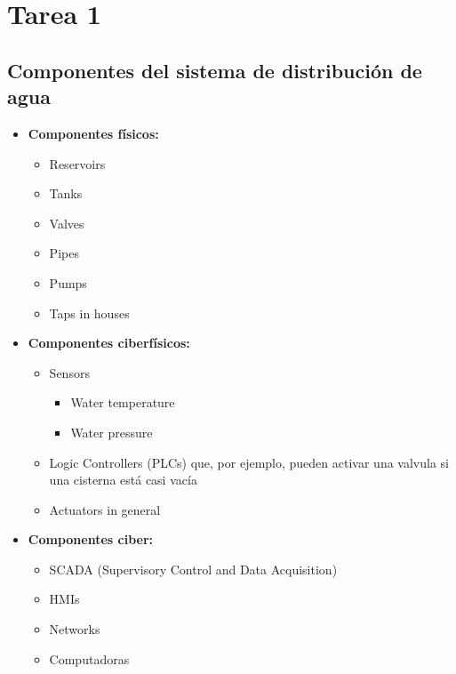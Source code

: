 \chapter{Tarea 1}








\section{Componentes del sistema de distribución de agua}

\begin{itemize}
   \item \textbf{Componentes físicos:}
   \begin{itemize}
      \item Reservoirs
      \item Tanks
      \item Valves
      \item Pipes
      \item Pumps
      \item Taps in houses
   \end{itemize}
   \item \textbf{Componentes ciberfísicos:}
   \begin{itemize}
      \item Sensors
      \begin{itemize}
         \item Water temperature
         \item Water pressure
      \end{itemize}
      \item Logic Controllers (PLCs) que, por ejemplo, pueden activar una valvula si una cisterna está casi vacía 
      \item Actuators in general
   \end{itemize}
   \item \textbf{Componentes ciber:}
   \begin{itemize}
      \item \textsc{SCADA} (Supervisory Control and Data Acquisition)
      \item HMIs
      \item Networks
      \item Computadoras
   \end{itemize}
\end{itemize}

